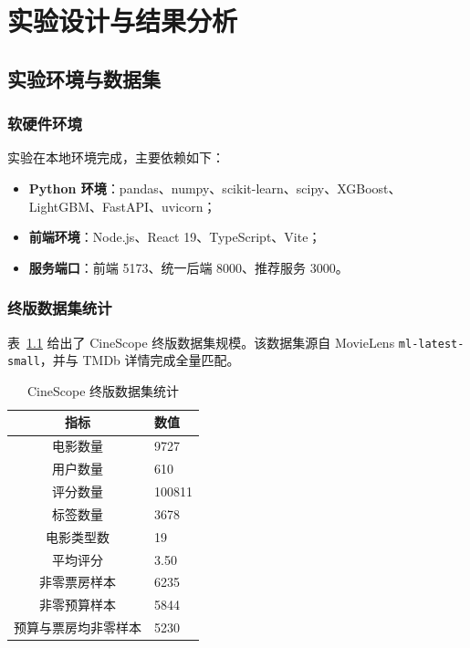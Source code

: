 \chapter{实验设计与结果分析}
\label{chap:experiment}

\section{实验环境与数据集}
\label{sec:exp:dataset}

\subsection{软硬件环境}

实验在本地环境完成，主要依赖如下：

\begin{itemize}
    \item \textbf{Python 环境}：pandas、numpy、scikit-learn、scipy、XGBoost、LightGBM、FastAPI、uvicorn；
    \item \textbf{前端环境}：Node.js、React 19、TypeScript、Vite；
    \item \textbf{服务端口}：前端 5173、统一后端 8000、推荐服务 3000。
\end{itemize}

\subsection{终版数据集统计}

表~\ref{tab:dataset} 给出了 CineScope 终版数据集规模。该数据集源自 MovieLens \texttt{ml-latest-small}，并与 TMDb 详情完成全量匹配。

\begin{table}[htbp]
    \centering
    \caption{CineScope 终版数据集统计} \label{tab:dataset}
    \begin{tabularx}{0.85\textwidth}{|c|X|}
        \hline
        \textbf{指标} & \textbf{数值} \\
        \hline
        电影数量 & 9727 \\
        \hline
        用户数量 & 610 \\
        \hline
        评分数量 & 100811 \\
        \hline
        标签数量 & 3678 \\
        \hline
        电影类型数 & 19 \\
        \hline
        平均评分 & 3.50 \\
        \hline
        非零票房样本 & 6235 \\
        \hline
        非零预算样本 & 5844 \\
        \hline
        预算与票房均非零样本 & 5230 \\
        \hline
    \end{tabularx}
\end{table}


